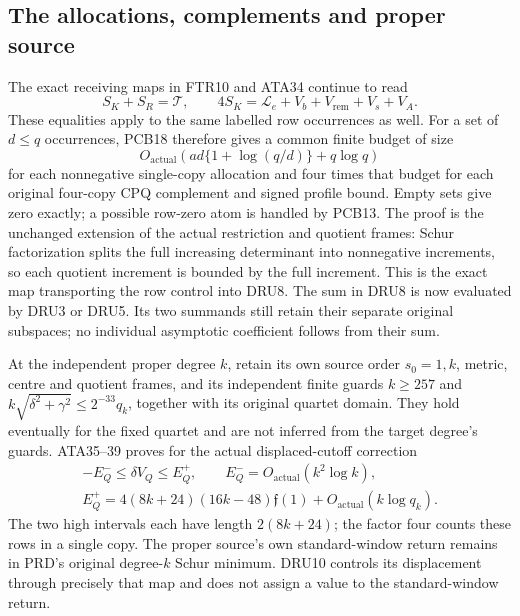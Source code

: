 \subsection{The allocations, complements and proper source}
The exact receiving maps in FTR10 and ATA34 continue to read
\[
 S_K+S_R=\mathcal T,\qquad
 4S_K=\mathcal L_e+V_b+V_{\mathrm{rem}}+V_s+V_A.
 \tag{DRU8}
\]
These equalities apply to the same labelled row occurrences as well.
For a set of $d\le q$ occurrences, PCB18 therefore gives a common
finite budget of size
\[
 O_{\mathrm{actual}}\!\left(
 ad\{1+\log(q/d)\}+q\log q\right)
 \tag{DRU9}
\]
for each nonnegative single-copy allocation and four times that
budget for each original four-copy CPQ complement and signed
profile bound.  Empty sets give zero exactly; a possible row-zero
atom is handled by PCB13.  The proof is the unchanged extension of
the actual restriction and quotient frames: Schur factorization
splits the full increasing determinant into nonnegative increments,
so each quotient increment is bounded by the full increment.
This is the exact map transporting the row control into DRU8.
The sum in DRU8 is now evaluated by DRU3 or DRU5.  Its two summands
still retain their separate original subspaces; no individual
asymptotic coefficient follows from their sum.

At the independent proper degree $k$, retain its own source order
$s_0=1,k$, metric, centre and quotient frames, and its independent
finite guards $k\ge257$ and
$k\sqrt{\delta^2+\gamma^2}\le2^{-33}q_k$, together with its original
quartet domain.  They hold eventually for the fixed quartet and are
not inferred from the target degree's guards.  ATA35--39 proves
for the actual displaced-cutoff correction
\[
\begin{gathered}
 -E_Q^-\le\delta V_Q\le E_Q^+,\qquad
 E_Q^-=O_{\mathrm{actual}}(k^2\log k),\\
 E_Q^+=4(8k+24)(16k-48)\mathfrak f(1)
            +O_{\mathrm{actual}}(k\log q_k).
\end{gathered}
 \tag{DRU10}
\]
The two high intervals each have length $2(8k+24)$; the factor
four counts these rows in a single copy.  The proper source's own
standard-window return remains in PRD's original degree-$k$
Schur minimum.  DRU10 controls its displacement through precisely
that map and does not assign a value to the standard-window return.

